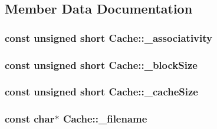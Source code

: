 \subsection{Member Data Documentation}
\hypertarget{class_cache_aa48d46cd82958c590c84ec1f91dbf261}{
\subsubsection[{\-\_\-associativity}]{\setlength{\rightskip}{0pt plus 5cm}const unsigned short {\bf Cache\-::\-\_\-associativity}}}\label{class_cache_aa48d46cd82958c590c84ec1f91dbf261}
\hypertarget{class_cache_a4f8fa4061ddaa6bd961564e7ce1ad382}{
\subsubsection[{\-\_\-block\-Size}]{\setlength{\rightskip}{0pt plus 5cm}const unsigned short {\bf Cache\-::\-\_\-block\-Size}}}\label{class_cache_a4f8fa4061ddaa6bd961564e7ce1ad382}
\hypertarget{class_cache_a36f90f0287a082a467fab29c442a92e8}{
\subsubsection[{\-\_\-cache\-Size}]{\setlength{\rightskip}{0pt plus 5cm}const unsigned short {\bf Cache\-::\-\_\-cache\-Size}}}\label{class_cache_a36f90f0287a082a467fab29c442a92e8}
\hypertarget{class_cache_acf6d51e277094078ec2be7982136c4e8}{
\subsubsection[{\-\_\-filename}]{\setlength{\rightskip}{0pt plus 5cm}const char$\ast$ {\bf Cache\-::\-\_\-filename}}}\label{class_cache_acf6d51e277094078ec2be7982136c4e8}
